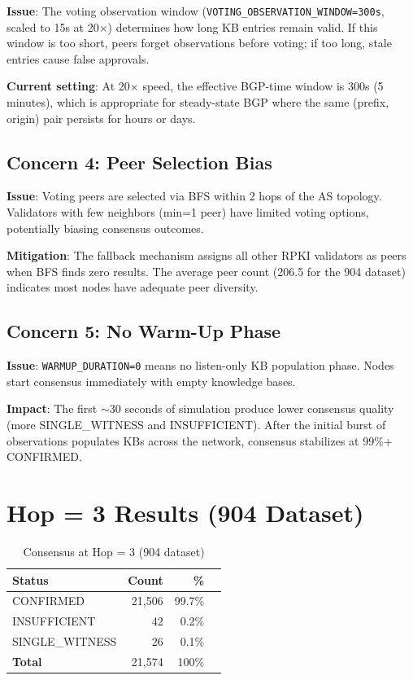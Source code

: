 \documentclass[11pt,a4paper]{article}
\begin{document}
\textbf{Issue}: The voting observation window (\texttt{VOTING\_OBSERVATION\_WINDOW=300s},
scaled to 15s at 20$\times$) determines how long KB entries remain valid. If this
window is too short, peers forget observations before voting; if too long,
stale entries cause false approvals.

\textbf{Current setting}: At 20$\times$ speed, the effective BGP-time window is 300s
(5 minutes), which is appropriate for steady-state BGP where the same (prefix, origin)
pair persists for hours or days.

\subsection{Concern 4: Peer Selection Bias}

\textbf{Issue}: Voting peers are selected via BFS within 2 hops of the AS topology.
Validators with few neighbors (min=1 peer) have limited voting options, potentially
biasing consensus outcomes.

\textbf{Mitigation}: The fallback mechanism assigns all other RPKI validators as
peers when BFS finds zero results. The average peer count (206.5 for the 904 dataset)
indicates most nodes have adequate peer diversity.

\subsection{Concern 5: No Warm-Up Phase}

\textbf{Issue}: \texttt{WARMUP\_DURATION=0} means no listen-only KB population phase.
Nodes start consensus immediately with empty knowledge bases.

\textbf{Impact}: The first $\sim$30 seconds of simulation produce lower consensus
quality (more SINGLE\_WITNESS and INSUFFICIENT). After the initial burst of
observations populates KBs across the network, consensus stabilizes at 99\%+
CONFIRMED.

\section{Hop = 3 Results (904 Dataset)}

\begin{table}[H]
\centering
\caption{Consensus at Hop = 3 (904 dataset)}
\begin{tabular}{lrrr}
\toprule
\textbf{Status} & \textbf{Count} & \textbf{\%} \\
\midrule
CONFIRMED           & 21,506 & 99.7\% \\
INSUFFICIENT        & 42     & 0.2\% \\
SINGLE\_WITNESS     & 26     & 0.1\% \\
\midrule
\textbf{Total}      & 21,574 & 100\% \\
\bottomrule
\end{tabular}
\end{table}
\end{document}
